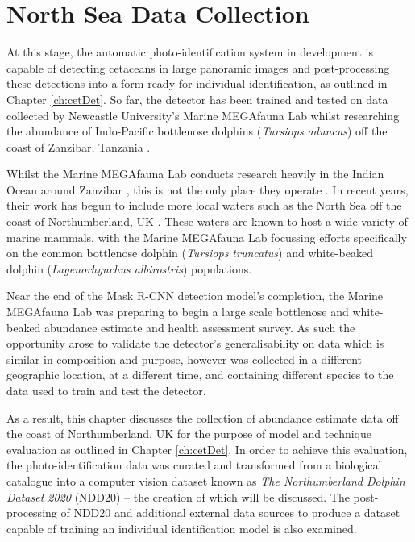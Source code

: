 \chapter{North Sea Data Collection} \label{ch:NDD}

At this stage, the automatic photo-identification system in development is capable of detecting cetaceans in large panoramic images and post-processing these detections into a form ready for individual identification, as outlined in Chapter \ref{ch:cetDet}. So far, the detector has been trained and tested on data collected by Newcastle University's Marine MEGAfauna Lab whilst researching the abundance of Indo-Pacific bottlenose dolphins (\textit{Tursiops aduncus}) off the coast of Zanzibar, Tanzania \cite{sharpe_indian_2019}. 

Whilst the Marine MEGAfauna Lab conducts research heavily in the Indian Ocean around Zanzibar \cite{yang_description_2020, temple_life-history_2020, temple_marine_2019, temple_marine_2018, weigmann_revision_2020, barrowclift_social_2017}, this is not the only place they operate \cite{temple_by-catch_2021, yang_classification_2017, yang_influence_2022}. In recent years, their work has begun to include more local waters such as the North Sea off the coast of Northumberland, UK \cite{van_bressem_visual_2018, yang_characterization_2021}. These waters are known to host a wide variety of marine mammals, with the Marine MEGAfauna Lab focussing efforts specifically on the common bottlenose dolphin (\textit{Tursiops truncatus}) and white-beaked dolphin (\textit{Lagenorhynchus albirostris}) populations.

Near the end of the Mask R-CNN detection model's completion, the Marine MEGAfauna Lab was preparing to begin a large scale bottlenose and white-beaked abundance estimate and health assessment survey. As such the opportunity arose to validate the detector's generalisability on data which is similar in composition and purpose, however was collected in a different geographic location, at a different time, and containing different species to the data used to train and test the detector.

As a result, this chapter discusses the collection of abundance estimate data off the coast of Northumberland, UK for the purpose of model and technique evaluation as outlined in Chapter \ref{ch:cetDet}. In order to achieve this evaluation, the photo-identification data was curated and transformed from a biological catalogue into a computer vision dataset known as \textit{The Northumberland Dolphin Dataset 2020} (NDD20) -- the creation of which will be discussed. The post-processing of NDD20 and additional external data sources to produce a dataset capable of training an individual identification model is also examined. 

